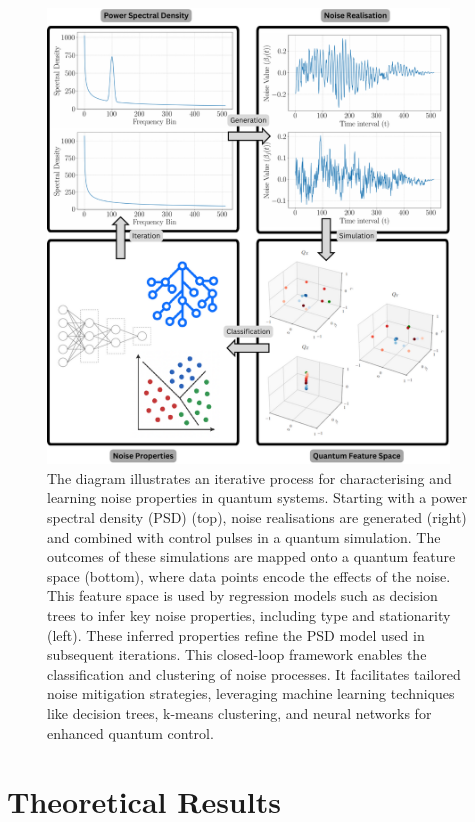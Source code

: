 \documentclass[12pt]{iopart}
\begin{document}
\begin{figure}
    \centering
    \includegraphics[width=0.95\textwidth]{figures/schematic.pdf}
    \caption{The diagram illustrates an iterative process for characterising and learning noise properties in quantum systems. Starting with a power spectral density (PSD) (top), noise realisations are generated (right) and combined with control pulses in a quantum simulation. The outcomes of these simulations are mapped onto a quantum feature space (bottom), where data points encode the effects of the noise. This feature space is used by regression models such as decision trees to infer key noise properties, including type and stationarity (left). These inferred properties refine the PSD model used in subsequent iterations. This closed-loop framework enables the classification and clustering of noise processes. It facilitates tailored noise mitigation strategies, leveraging machine learning techniques like decision trees, k-means clustering, and neural networks for enhanced quantum control.}
    \label{fig:schematic}
\end{figure}

\section{Theoretical Results \label{sec:noise_operator_formalism}}
\end{document}

